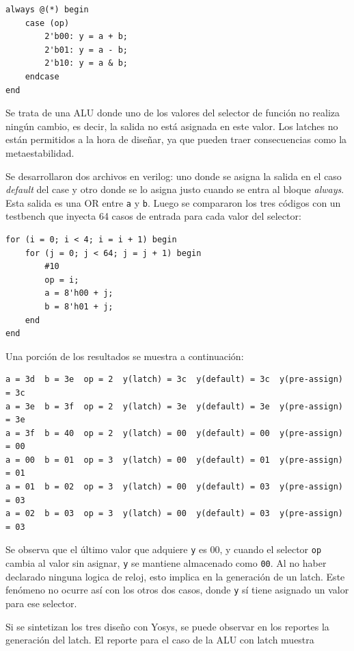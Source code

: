 \documentclass[12pt,a4paper]{article}
\begin{document}
\begin{verbatim}
always @(*) begin
    case (op)
        2'b00: y = a + b;
        2'b01: y = a - b;
        2'b10: y = a & b;
    endcase
end
\end{verbatim}

Se trata de una ALU donde uno de los valores del selector de función no realiza ningún cambio, es decir, la salida no está asignada en este valor. Los latches no están permitidos a la hora de diseñar, ya que pueden traer consecuencias como la metaestabilidad.

Se desarrollaron dos archivos en verilog: uno donde se asigna la salida en el caso \emph{default} del case y otro donde se lo asigna justo cuando se entra al bloque \emph{always}. Esta salida es una OR entre \texttt{a} y \texttt{b}. Luego se compararon los tres códigos con un testbench que inyecta 64 casos de entrada para cada valor del selector:

\begin{verbatim}
for (i = 0; i < 4; i = i + 1) begin
    for (j = 0; j < 64; j = j + 1) begin
        #10
        op = i;
        a = 8'h00 + j;
        b = 8'h01 + j;
    end
end
\end{verbatim}

Una porción de los resultados se muestra a continuación:

\begin{verbatim}
a = 3d  b = 3e  op = 2  y(latch) = 3c  y(default) = 3c  y(pre-assign) = 3c
a = 3e  b = 3f  op = 2  y(latch) = 3e  y(default) = 3e  y(pre-assign) = 3e
a = 3f  b = 40  op = 2  y(latch) = 00  y(default) = 00  y(pre-assign) = 00
a = 00  b = 01  op = 3  y(latch) = 00  y(default) = 01  y(pre-assign) = 01
a = 01  b = 02  op = 3  y(latch) = 00  y(default) = 03  y(pre-assign) = 03
a = 02  b = 03  op = 3  y(latch) = 00  y(default) = 03  y(pre-assign) = 03
\end{verbatim}

Se observa que el último valor que adquiere \texttt{y} es 00, y cuando el selector \texttt{op} cambia al valor sin asignar, \texttt{y} se mantiene almacenado como \texttt{00}. Al no haber declarado ninguna logica de reloj, esto implica en la generación de un latch. Este fenómeno no ocurre así con los otros dos casos, donde \texttt{y} sí tiene asignado un valor para ese selector.

Si se sintetizan los tres diseño con Yosys, se puede observar en los reportes la generación del latch. El reporte para el caso de la ALU con latch muestra
\end{document}
